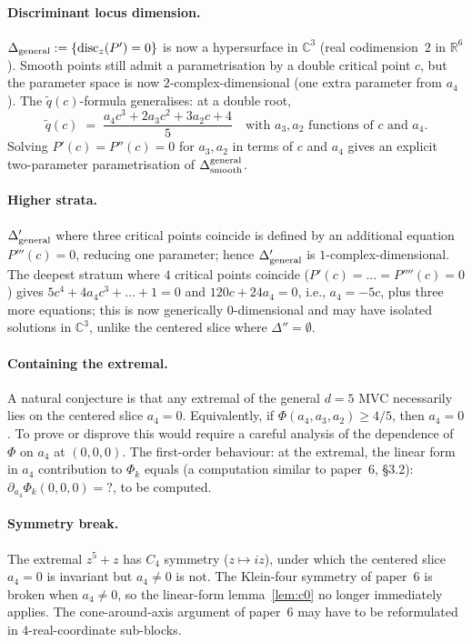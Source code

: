 \documentclass[11pt,a4paper]{article}
\begin{document}
\paragraph{Discriminant locus dimension.}
$\Delta_{\rm general} := \{\mathrm{disc}_z(P')=0\}$ is now a
hypersurface in $\mathbb{C}^3$ (real codimension~$2$ in
$\mathbb{R}^6$). Smooth points still admit a parametrisation by a
double critical point $c$, but the parameter space is now
$2$-complex-dimensional (one extra parameter from $a_4$). The
$\widetilde q(c)$-formula generalises: at a double root,
\[
\widetilde q(c) \;=\; \frac{a_4 c^3 + 2 a_3 c^2 + 3 a_2 c + 4}{5}
\quad\text{with } a_3,a_2 \text{ functions of } c \text{ and } a_4.
\]
Solving $P'(c)=P''(c)=0$ for $a_3, a_2$ in terms of $c$ and $a_4$
gives an explicit two-parameter parametrisation of
$\Delta_{\rm smooth}^{\rm general}$.

\paragraph{Higher strata.}
$\Delta'_{\rm general}$ where three critical points coincide is
defined by an additional equation $P'''(c)=0$, reducing one parameter;
hence $\Delta'_{\rm general}$ is $1$-complex-dimensional. The deepest
stratum where $4$ critical points coincide ($P'(c)=\dots=P''''(c)=0$)
gives $5c^4+4a_4 c^3+\dots+1=0$ and $120c+24 a_4 = 0$, i.e.,
$a_4=-5c$, plus three more equations; this is now generically
$0$-dimensional and may have isolated solutions in
$\mathbb{C}^3$, unlike the centered slice where $\Delta''=\emptyset$.

\paragraph{Containing the extremal.}
A natural conjecture is that any extremal of the general $d=5$ MVC
necessarily lies on the centered slice $a_4=0$. Equivalently, if
$\Phi(a_4,a_3,a_2)\ge 4/5$, then $a_4=0$. To prove or disprove this
would require a careful analysis of the dependence of $\Phi$ on
$a_4$ at $(0,0,0)$. The first-order behaviour: at the extremal, the
linear form in $a_4$ contribution to $\Phi_k$ equals (a computation
similar to paper~6, §3.2):
$\partial_{a_4}\Phi_k(0,0,0) = ?$, to be computed.

\paragraph{Symmetry break.}
The extremal $z^5+z$ has $C_4$ symmetry ($z\mapsto iz$), under which
the centered slice $a_4=0$ is invariant but $a_4\neq 0$ is not. The
Klein-four symmetry of paper~6 is broken when $a_4\neq 0$, so the
linear-form lemma~\ref{lem:c0} no longer immediately applies.
The cone-around-axis argument of paper~6 may have to be reformulated
in $4$-real-coordinate sub-blocks.
\end{document}
